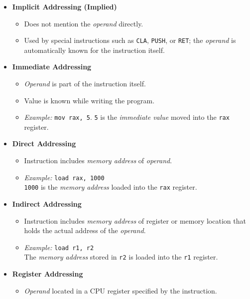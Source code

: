 \documentclass[12pt, letterpaper]{article}
\begin{document}
\begin{itemize}
    \item \textbf{Implicit Addressing (Implied)}
        \begin{itemize}
            \item Does not mention the \textit{operand} directly.
            \item Used by special instructions such as \texttt{CLA}, \texttt{PUSH}, or \texttt{RET}; the \textit{operand} is automatically known for the instruction itself.
        \end{itemize}
    \item \textbf{Immediate Addressing}
        \begin{itemize}
            \item \textit{Operand} is part of the instruction itself.
            \item Value is known while writing the program.
            \item \textit{Example:} \texttt{mov rax, 5}. \texttt{5} is the \textit{immediate value} moved into the \texttt{rax} register.
        \end{itemize}
    \item \textbf{Direct Addressing}
        \begin{itemize}
            \item Instruction includes \textit{memory address} of \textit{operand}.
            \item \textit{Example:} \texttt{load rax, 1000} \\ \texttt{1000} is the \textit{memory address} loaded into the \texttt{rax} register.
        \end{itemize}
    \item \textbf{Indirect Addressing}
        \begin{itemize}
            \item Instruction includes \textit{memory address} of register or memory location that holds the actual address of the \textit{operand}.
            \item \textit{Example:} \texttt{load r1, r2} \\ The \textit{memory address} stored in \texttt{r2} is loaded into the \texttt{r1} register.
        \end{itemize}
    \item \textbf{Register Addressing}
        \begin{itemize}
            \item \textit{Operand} located in a CPU register specified by the instruction.

\end{itemize}
\end{itemize}
\end{document}
